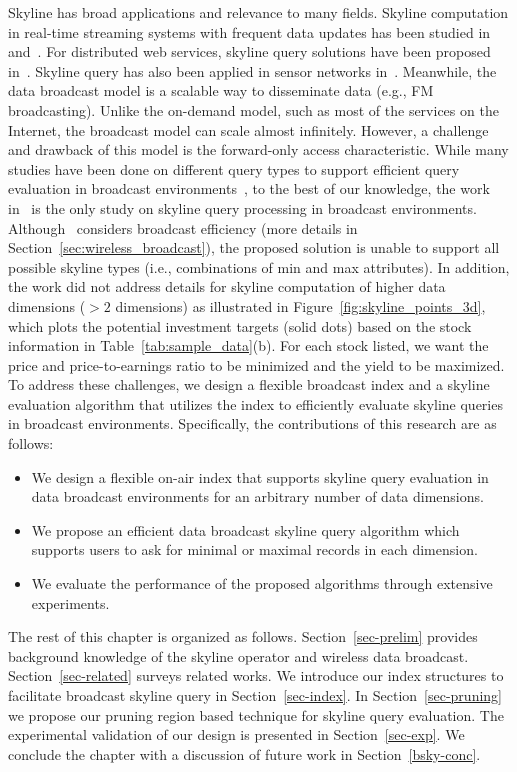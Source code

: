 Skyline has broad applications and relevance to many fields.
Skyline computation in real-time streaming systems with frequent
data updates has been studied in~\cite{conf/icde/LinYWL05}
and~\cite{journals/tkde/TaoP06}. For distributed web services,
skyline query solutions have been proposed
in~\cite{conf/edbt/BalkeGZ04}. Skyline query has also been applied
in sensor networks in~\cite{conf/cikm/ChenLY09}. Meanwhile, the
data broadcast model is a scalable way to disseminate data (e.g.,
FM broadcasting). Unlike the on-demand model, such as most of the
services on the Internet, the broadcast model can scale almost
infinitely. However, a challenge and drawback of this model is the
forward-only access characteristic. While many studies have been
done on different query types to support efficient query
evaluation in broadcast
environments~\cite{conf/dexa/HaKCL09,conf/icde/KuZW07,journals/tmc/KuZW08,
journals/vldb/ZhengLLLS09,conf/cikm/Hara02}, to the best of our
knowledge, the work in~\cite{conf/dexa/HaKCL09} is the only study
on skyline query processing in broadcast environments.
Although~\cite{conf/dexa/HaKCL09} considers broadcast efficiency
(more details in Section~\ref{sec:wireless_broadcast}), the
proposed solution is unable to support all possible skyline types
(i.e., combinations of min and max attributes). In addition, the
work did not address details for skyline computation of higher
data dimensions ($>2$ dimensions) as illustrated in
Figure~\ref{fig:skyline_points_3d}, which plots the potential
investment targets (solid dots) based on the stock information in
Table~\ref{tab:sample_data}(b). For each stock listed, we want the
price and price-to-earnings ratio to be minimized and the yield to
be maximized. To address these challenges, we design a flexible
broadcast index and a skyline evaluation algorithm that utilizes
the index to efficiently evaluate skyline queries in broadcast
environments. Specifically, the contributions of this research are
as follows:

\begin{itemize}
\item We design a flexible on-air index that supports skyline
query evaluation in data broadcast environments for an arbitrary
number of data dimensions.

\item We propose an efficient data broadcast skyline query
algorithm which supports users to ask for minimal or maximal
records in each dimension.

\item We evaluate the performance of the proposed algorithms
through extensive experiments.
\end{itemize}

The rest of this chapter is organized as follows.
Section~\ref{sec-prelim} provides background knowledge of the
skyline operator and wireless data broadcast.
Section~\ref{sec-related} surveys related works. We introduce our
index structures to facilitate broadcast skyline query in
Section~\ref{sec-index}. In Section~\ref{sec-pruning} we propose
our pruning region based technique for skyline query evaluation.
The experimental validation of our design is presented in
Section~\ref{sec-exp}. We conclude the chapter with a discussion of future work in
Section~\ref{bsky-conc}.
